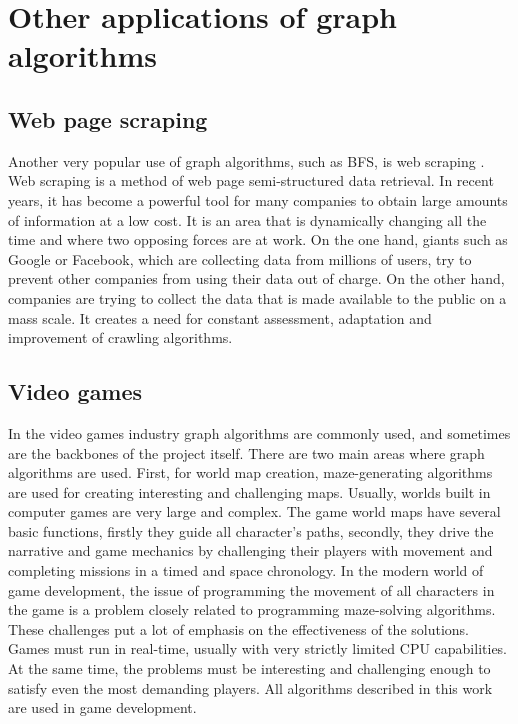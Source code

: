 \section{Other applications of graph algorithms}
\subsection{Web page scraping}
Another very popular use of graph algorithms, such as BFS, is web scraping \cite{Nurdin}. Web scraping is a method of web page semi-structured data retrieval. In recent years, it has become a powerful tool
for many companies to obtain large amounts of information at a low cost. It is an area that is dynamically changing all the time and where two opposing forces are at work. On the one hand,
giants such as Google or Facebook, which are collecting data from millions of users, try to prevent other companies from using their data out of charge. On the other hand, companies 
are trying to collect the data that is made available to the public on a mass scale. It creates a need for constant assessment, adaptation and improvement of crawling algorithms.
\subsection{Video games}
In the video games industry graph algorithms are commonly used, and sometimes are the backbones of the project itself. There are two main areas where graph algorithms are used. 
First, for world map creation, maze-generating algorithms are used for creating interesting and challenging maps. Usually, worlds built in computer games are very large and complex.
The game world maps have several basic functions, firstly they guide all character's paths, secondly, they drive the narrative and game mechanics by challenging their players with movement
and completing missions in a timed and space chronology. In the modern world of game development, the issue of programming the movement of all characters in 
the game is a problem closely related to programming maze-solving algorithms. These challenges put a lot of emphasis on the effectiveness of the solutions. 
Games must run in real-time, usually with very strictly limited CPU capabilities. At the same time, the problems must be interesting and challenging enough 
to satisfy even the most demanding players. All algorithms described in this work are used in game development.\cite{Candra}
